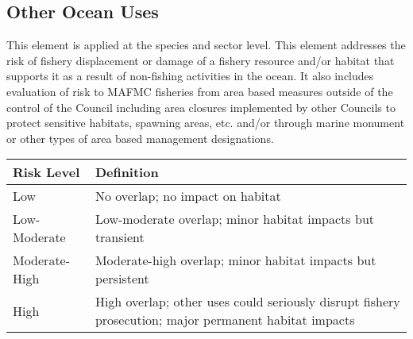 \documentclass[11pt,]{article}
\begin{document}
\subsection{Other Ocean Uses}\label{other-ocean-uses}

This element is applied at the species and sector level. This element
addresses the risk of fishery displacement or damage of a fishery
resource and/or habitat that supports it as a result of non-fishing
activities in the ocean. It also includes evaluation of risk to MAFMC
fisheries from area based measures outside of the control of the Council
including area closures implemented by other Councils to protect
sensitive habitats, spawning areas, etc. and/or through marine monument
or other types of area based management designations.

\begin{longtable}[]{@{}ll@{}}
\toprule
\begin{minipage}[b]{0.22\columnwidth}\raggedright\strut
Risk Level\strut
\end{minipage} & \begin{minipage}[b]{0.72\columnwidth}\raggedright\strut
Definition\strut
\end{minipage}\tabularnewline
\midrule
\endhead
\begin{minipage}[t]{0.22\columnwidth}\raggedright\strut
Low\strut
\end{minipage} & \begin{minipage}[t]{0.72\columnwidth}\raggedright\strut
No overlap; no impact on habitat\strut
\end{minipage}\tabularnewline
\begin{minipage}[t]{0.22\columnwidth}\raggedright\strut
Low-Moderate\strut
\end{minipage} & \begin{minipage}[t]{0.72\columnwidth}\raggedright\strut
Low-moderate overlap; minor habitat impacts but transient\strut
\end{minipage}\tabularnewline
\begin{minipage}[t]{0.22\columnwidth}\raggedright\strut
Moderate-High\strut
\end{minipage} & \begin{minipage}[t]{0.72\columnwidth}\raggedright\strut
Moderate-high overlap; minor habitat impacts but persistent\strut
\end{minipage}\tabularnewline
\begin{minipage}[t]{0.22\columnwidth}\raggedright\strut
High\strut
\end{minipage} & \begin{minipage}[t]{0.72\columnwidth}\raggedright\strut
High overlap; other uses could seriously disrupt fishery prosecution;
major permanent habitat impacts\strut
\end{minipage}\tabularnewline
\bottomrule
\end{longtable}
\end{document}
